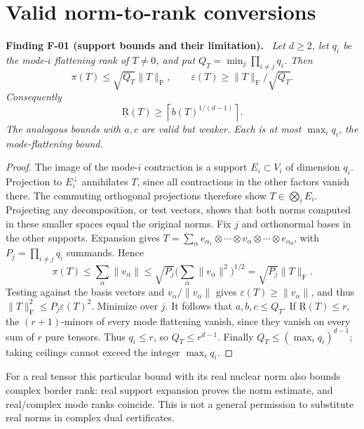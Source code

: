 \documentclass[11pt]{article}
\newcommand{\BR}{\underline{\mathrm R}}\newcommand{\TR}{\mathrm R}
\newcommand{\HS}[1]{\lVert #1\rVert_{\mathrm F}}
\newcommand{\eps}{\varepsilon}
\newcommand{\ceil}[1]{\left\lceil#1\right\rceil}
\newenvironment{finding}[2]{\par\medskip\noindent\textbf{Finding #1 (#2).}\ \itshape}{\par\medskip}
\begin{document}
\section{Valid norm-to-rank conversions}
\begin{finding}{F-01}{support bounds and their limitation}
Let $d\geq2$, let $q_i$ be the mode-$i$ flattening rank of $T\ne0$,
and put $Q_T=\min_j\prod_{i\ne j}q_i$. Then
\begin{equation}\label{eq:support}
 \pi(T)\leq\sqrt{Q_T}\HS T,\qquad
 \eps(T)\geq\HS T/\sqrt{Q_T}.
\end{equation}
Consequently
\begin{equation}\label{eq:support-rank}
 \BR(T)\geq\ceil{b(T)^{1/(d-1)}}.
\end{equation}
The analogous bounds with $a,c$ are valid but weaker. Each is at most
$\max_iq_i$, the mode-flattening bound.
\end{finding}
\begin{proof}
The image of the mode-$i$ contraction is a support $E_i\subset V_i$
of dimension $q_i$. Projection to $E_i^\perp$ annihilates $T$, since
all contractions in the other factors vanish there. The commuting
orthogonal projections therefore show $T\in\bigotimes_i E_i$.
Projecting any decomposition, or test vectors, shows that both norms
computed in these smaller spaces equal the original norms.
Fix $j$ and orthonormal bases in the other supports. Expansion gives
$T=\sum_\alpha e_{\alpha_1}\otimes\cdots\otimes v_\alpha
\otimes\cdots\otimes e_{\alpha_d}$, with $P_j=\prod_{i\ne j}q_i$
summands. Hence
\[
 \pi(T)\leq\sum_\alpha\|v_\alpha\|
 \leq\sqrt{P_j}\Big(\sum_\alpha\|v_\alpha\|^2\Big)^{1/2}
 =\sqrt{P_j}\HS T.
\]
Testing against the basis vectors and $v_\alpha/\|v_\alpha\|$
gives $\eps(T)\geq\|v_\alpha\|$, and thus
$\HS T^2\leq P_j\eps(T)^2$. Minimize over $j$.
It follows that $a,b,c\leq Q_T$.
If $\BR(T)\leq r$, the $(r+1)$-minors of every mode flattening
vanish, since they vanish on every sum of $r$ pure tensors.
Thus $q_i\leq r$, so $Q_T\leq r^{d-1}$.
Finally $Q_T\leq(\max_iq_i)^{d-1}$; taking ceilings cannot
exceed the integer $\max_iq_i$.
\end{proof}
For a real tensor this particular bound with its real nuclear norm
also bounds complex border rank: real support expansion proves the
norm estimate, and real/complex mode ranks coincide. This is not a
general permission to substitute real norms in complex dual certificates.
\end{document}
